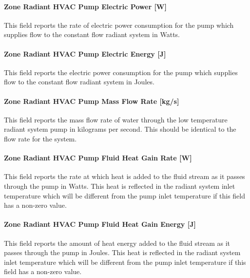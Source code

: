 \paragraph{Zone Radiant HVAC Pump Electric Power {[}W{]}}\label{zone-radiant-hvac-pump-electric-power-w}

This field reports the rate of electric power consumption for the pump which supplies flow to the constant flow radiant system in Watts.

\paragraph{Zone Radiant HVAC Pump Electric Energy {[}J{]}}\label{zone-radiant-hvac-pump-electric-energy-j}

This field reports the electric power consumption for the pump which supplies flow to the constant flow radiant system in Joules.

\paragraph{Zone Radiant HVAC Pump Mass Flow Rate {[}kg/s{]}}\label{zone-radiant-hvac-pump-mass-flow-rate-kgs}

This field reports the mass flow rate of water through the low temperature radiant system pump in kilograms per second. This should be identical to the flow rate for the system.

\paragraph{Zone Radiant HVAC Pump Fluid Heat Gain Rate {[}W{]}}\label{zone-radiant-hvac-pump-fluid-heat-gain-rate-w}

This field reports the rate at which heat is added to the fluid stream as it passes through the pump in Watts. This heat is reflected in the radiant system inlet temperature which will be different from the pump inlet temperature if this field has a non-zero value.

\paragraph{Zone Radiant HVAC Pump Fluid Heat Gain Energy {[}J{]}}\label{zone-radiant-hvac-pump-fluid-heat-gain-energy-j}

This field reports the amount of heat energy added to the fluid stream as it passes through the pump in Joules. This heat is reflected in the radiant system inlet temperature which will be different from the pump inlet temperature if this field has a non-zero value.

